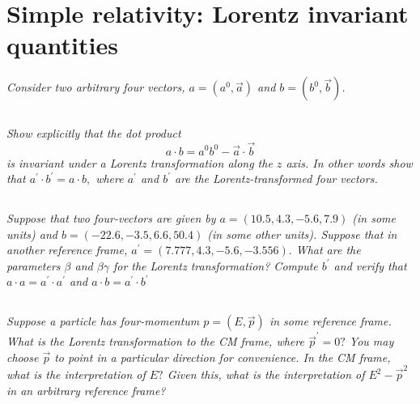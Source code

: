 \documentclass{article}
\begin{document}
\newpage


\section{Simple relativity: Lorentz invariant quantities}
\textit{Consider two arbitrary four vectors, $a=\left(a^{0}, \vec{a}\right)$ and $b=\left(b^{0}, \vec{b}\right)$.}

\subsection{}
\textit{Show explicitly that the dot product
$$
a \cdot b=a^{0} b^{0}-\vec{a} \cdot \vec{b}
$$
is invariant under a Lorentz transformation along the $z$ axis. In other words show that $a^{\prime} \cdot b^{\prime}=a \cdot b,$ where $a^{\prime}$ and $b^{\prime}$ are the Lorentz-transformed four vectors.}

\subsection{}
\textit{Suppose that two four-vectors are given by $a=(10.5,4.3,-5.6,7.9)$ (in some units) and $b=(-22.6,-3.5,6.6,50.4)$ (in some other units). Suppose that in another reference frame, $a^{\prime}=(7.777,4.3,-5.6,-3.556) .$ What are the parameters $\beta$ and $\beta \gamma$ for the Lorentz transformation? Compute $b^{\prime}$ and verify that $a \cdot a=a^{\prime} \cdot a^{\prime}$ and $a \cdot b=a^{\prime} \cdot b^{\prime}$}

\subsection{}
\textit{Suppose a particle has four-momentum $p=(E, \vec{p})$ in some reference frame. What is the Lorentz transformation to the CM frame, where $\vec{p}^{\prime}=0 ?$ You may choose $\vec{p}$ to point in a particular direction for convenience. In the CM frame, what is the interpretation of $E ?$ Given this, what is the interpretation of $E^{2}-\vec{p}^{2}$ in an arbitrary reference frame?}


\newpage
\section{}
\subsection{}
\textit{}
\end{document}
